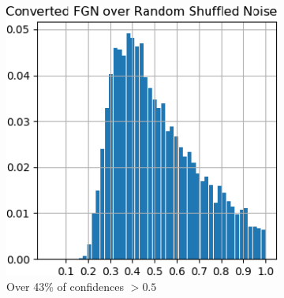 \documentclass[12pt,oneside]{CUNY_PhD}
\begin{document}
\begin{figure}[!h]
\begin{subfigure}[t]{0.49\textwidth}
        \includegraphics[width=\textwidth]{images/mnist-behavior/converted-hist-shuffled.png}
        \caption*{Over 43\% of confidences $>0.5$}
    \end{subfigure}
    \caption{}
    \label{fig:converted-hist}
\end{figure}
\end{document}
